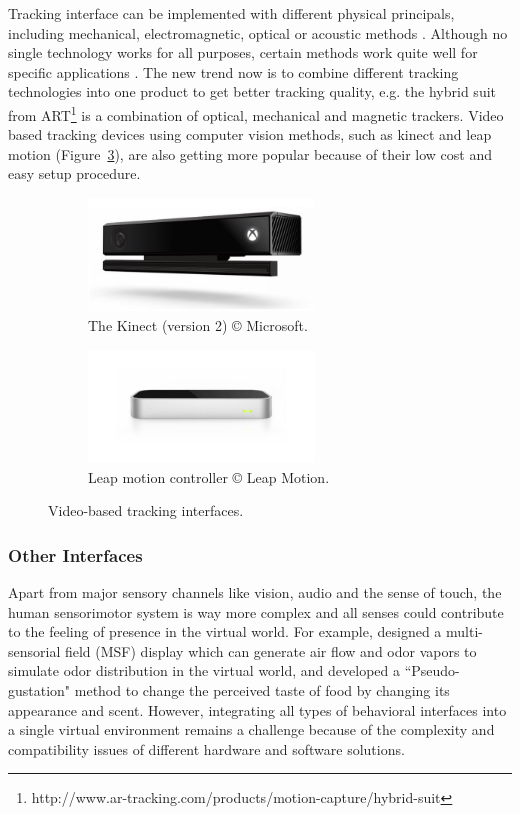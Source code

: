 Tracking interface can be implemented with different physical principals, including mechanical, electromagnetic, optical or acoustic methods \citep{Meyer1992Survey}. Although no single technology works for all purposes, certain methods work quite well for specific applications \citep{Welch2002Survey}. The new trend now is to combine different tracking technologies into one product to get better tracking quality, e.g. the hybrid suit from ART\footnote{http://www.ar-tracking.com/products/motion-capture/hybrid-suit} is a combination of optical, mechanical and magnetic trackers. Video based tracking devices using computer vision methods, such as kinect and leap motion (Figure~\ref{fig:1_video_tracking}), are also getting more popular because of their low cost and easy setup procedure.

\begin{figure}[htb]
  \begin{subfigure}{.5\textwidth}
    \centering
    \includegraphics[height=3cm]{figures/ch1/kinect}
    \caption{The Kinect (version 2) \copyright{} Microsoft.}
    \label{fig:1_video_tracking:kinect}
  \end{subfigure}
  \begin{subfigure}{.5\textwidth}
    \centering
    \includegraphics[height=3cm]{figures/ch1/leap}
    \caption{Leap motion controller \copyright{} Leap Motion.}
    \label{fig:1_video_tracking:leap}
  \end{subfigure}
  \caption{\label{fig:1_video_tracking}Video-based tracking interfaces.}
\end{figure}

\subsubsection{Other Interfaces}
Apart from major sensory channels like vision, audio and the sense of touch, the human sensorimotor system is way more complex and all senses could contribute to the feeling of presence in the virtual world. For example, \citet{Matsukura2011MSF} designed a multi-sensorial field (MSF) display which can generate air flow and odor vapors to simulate odor distribution in the virtual world, and \citet{Narumi2011Flavors} developed a ``Pseudo-gustation" method to change the perceived taste of food by changing its appearance and scent. However, integrating all types of behavioral interfaces into a single virtual environment remains a challenge because of the complexity and compatibility issues of different hardware and software solutions. 


